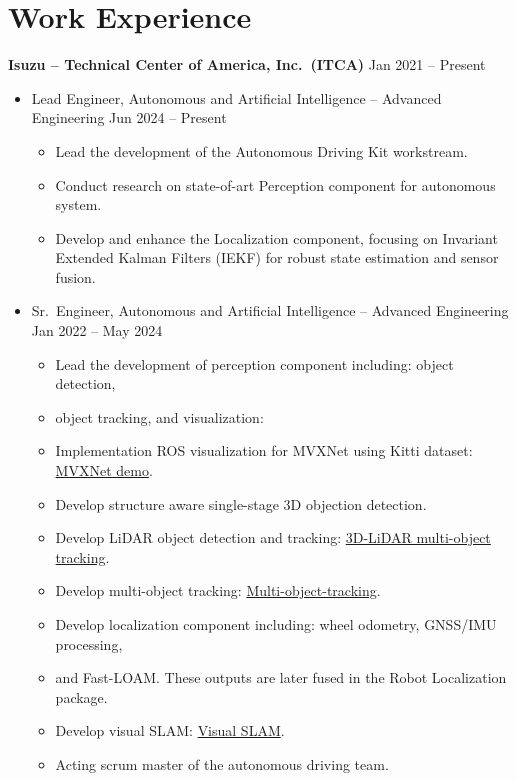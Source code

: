 \documentclass[a4paper,10pt,dvipdfmx]{article}
\begin{document}
\section*{Work Experience}
\textbf{Isuzu -- Technical Center of America, Inc.~(ITCA)} \hfill Jan 2021 -- Present
\begin{itemize}[noitemsep,nolistsep]
  \item[] Lead Engineer, Autonomous and Artificial Intelligence -- Advanced Engineering \hfill Jun 2024 -- Present
    \begin{itemize}[noitemsep,nolistsep]
      \item Lead the development of the Autonomous Driving Kit workstream.
      \item Conduct research on state-of-art Perception component for autonomous system.
      \item Develop and enhance the Localization component, focusing on Invariant Extended
        Kalman Filters (IEKF) for robust state estimation and sensor fusion.
    \end{itemize}
  \item[] Sr.~Engineer, Autonomous and Artificial Intelligence -- Advanced Engineering \hfill Jan 2022 -- May 2024
    \begin{itemize}[noitemsep,nolistsep]
      \item Lead the development of perception component including: object detection,
      \item[] object tracking, and visualization:
      \item[] Implementation ROS visualization for MVXNet using Kitti dataset: \href{https://youtu.be/LQHUm6AnVdg}{MVXNet demo}.
      \item[] Develop structure aware single-stage 3D objection detection.
      \item[] Develop LiDAR object detection and tracking: \href{https://youtu.be/hfo4PdJBrFU}{3D-LiDAR multi-object tracking}.
      \item[] Develop multi-object tracking: \href{https://youtu.be/WCiK4gFPqtM}{Multi-object-tracking}.
      \item Develop localization component including: wheel odometry, GNSS/IMU processing,
      \item[] and Fast-LOAM. These outputs are later fused in the Robot Localization package.
      \item[] Develop visual SLAM: \href{https://youtu.be/Z5XTmDap_Pk}{Visual SLAM}.
      \item Acting scrum master of the autonomous driving team.

\end{itemize}
\end{itemize}
\end{document}
